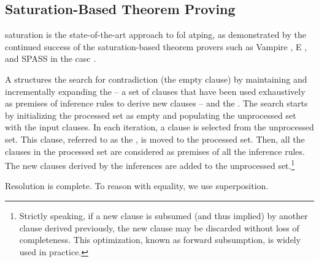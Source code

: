 \subsection{Saturation-Based Theorem Proving}

\Gls{saturation} is the state-of-the-art approach to \gls{fol} \gls{atping},
as demonstrated by the continued success of the saturation-based theorem provers such as Vampire \cite{DBLP:conf/cav/KovacsV13}, E \cite{DBLP:conf/cade/0001CV19}, and SPASS \cite{DBLP:conf/cade/WeidenbachDFKSW09} in the \gls{casc} \cite{Sut16}.

A  structures the search for contradiction
(the empty clause)
by maintaining and incrementally expanding the 
-- a set of clauses that have been used exhaustively as premises of inference rules to derive new clauses -- and the .
The search starts by initializing the processed set as empty and populating the unprocessed set with the input clauses.
In each iteration,
a clause is selected from the unprocessed set.
This clause, referred to as the , is moved to the processed set.
Then, all the clauses in the processed set are considered as premises of all the inference rules.
The new clauses derived by the inferences are added to the unprocessed set.\footnote{Strictly speaking, if a new clause is subsumed (and thus implied) by another clause derived previously, the new clause may be discarded without loss of completeness. This optimization, known as forward subsumption, is widely used in practice.}


Resolution is complete.
To reason with equality, we use superposition.

